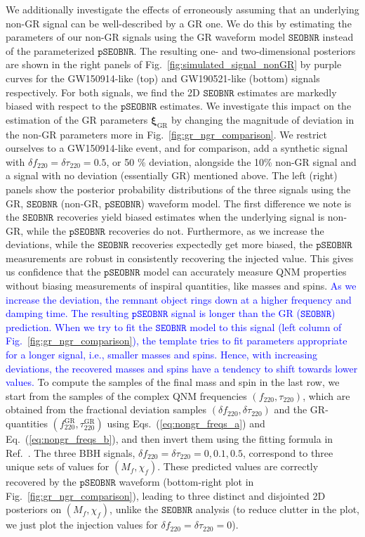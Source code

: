 \documentclass[twocolumn,prd,aps,superscriptaddress,preprintnumbers,tightenlines,showpacs,nofootinbib,eqsecnum,amsfonts,amsmath]{revtex4-1}
\newcommand{\bxigr}{\bm{\xi}_{\text{GR}}}
\newcommand{\df}[1]{\delta f_{\text{#1}}}
\newcommand{\dtau}[1]{\delta \tau_{\text{#1}}}
\newcommand{\fngr}[1]{f_{\text{#1}}}
\newcommand{\taungr}[1]{\tau_{\text{#1}}}
\newcommand{\fgr}[1]{f ^{\text{GR}}_{\text{#1}}}
\newcommand{\taugr}[1]{\tau ^{\text{GR}}_{\text{#1}}}
\newcommand{\pSEOB}{\texttt{pSEOBNR}}
\newcommand{\SEOB}{\texttt{SEOBNR}}
\begin{document}
We additionally investigate the effects of erroneously assuming that
an underlying non-GR signal can be well-described by a GR one. We do
this by estimating the parameters of our non-GR signals using the GR
waveform model $\SEOB$ instead of the parameterized $\pSEOB$.  The
resulting one- and two-dimensional posteriors are shown in the right
panels of Fig.~\ref{fig:simulated_signal_nonGR} by purple curves for the
GW150914-like (top) and GW190521-like (bottom) signals
respectively. For both signals, we find the 2D $\SEOB$ estimates are
markedly biased with respect to the $\pSEOB$ estimates.  We investigate 
this impact on the estimation of the GR parameters $\bxigr$ by changing the
magnitude of deviation in the non-GR parameters more in Fig.~\ref{fig:gr_ngr_comparison}. We restrict ourselves 
to a GW150914-like event, and for comparison, add a synthetic signal
with $\df{220} = \dtau{220} = 0.5$, or 50 \% deviation, alongside the
10\% non-GR signal and a signal with no deviation (essentially GR)
mentioned above. The left (right) panels show the
posterior probability distributions of the three signals using the GR,
$\SEOB$ (non-GR, $\pSEOB$) waveform model. The first difference we
note is the $\SEOB$ recoveries yield biased estimates when the
underlying signal is non-GR, while the $\pSEOB$ recoveries do
not. Furthermore, as we increase the deviations, while the $\SEOB$
recoveries expectedly get more biased, the $\pSEOB$ measurements are
robust in consistently recovering the injected value. This gives us 
confidence that the $\pSEOB$ model can accurately measure QNM 
properties without biasing measurements of inspiral quantities, like masses and spins. 
\textcolor{blue}{As we increase the deviation, the remnant object rings down at a higher frequency and damping time. The resulting $\pSEOB$ signal is longer than the GR ($\SEOB$) prediction. When we try to fit the $\SEOB$ model to this signal (left column of Fig.~\ref{fig:gr_ngr_comparison}), the template tries to fit parameters appropriate for a longer signal, i.e., smaller masses and spins. Hence, with increasing deviations, the recovered masses and spins have a tendency to shift towards lower values.}
To compute the samples of the final mass and spin in the last row, we start from the samples
of the complex QNM frequencies $(\fngr{220}, \taungr{220})$, which are obtained from the 
fractional deviation samples $(\df{220},\dtau{220})$ and the GR-quantities
$(\fgr{220},\taugr{220})$ using Eqs.~(\ref{eq:nongr_freqs_a}) and Eq.~(\ref{eq:nongr_freqs_b}),
and then invert them using the fitting formula in Ref.~\cite{Berti:2005ys}.
The three BBH signals, $\df{220} = \dtau{220} = 0, 0.1, 0.5$, correspond to
three unique sets of values for $(M_f,\chi_f)$. These predicted values are correctly 
recovered by the $\pSEOB$ waveform (bottom-right plot in Fig.~\ref{fig:gr_ngr_comparison}),
leading to three distinct and disjointed 2D posteriors on $(M_f,\chi_f)$, unlike the $\SEOB$
analysis (to reduce clutter in the plot, we just plot the injection values for $\df{220} = \dtau{220} = 0$). 
\end{document}
